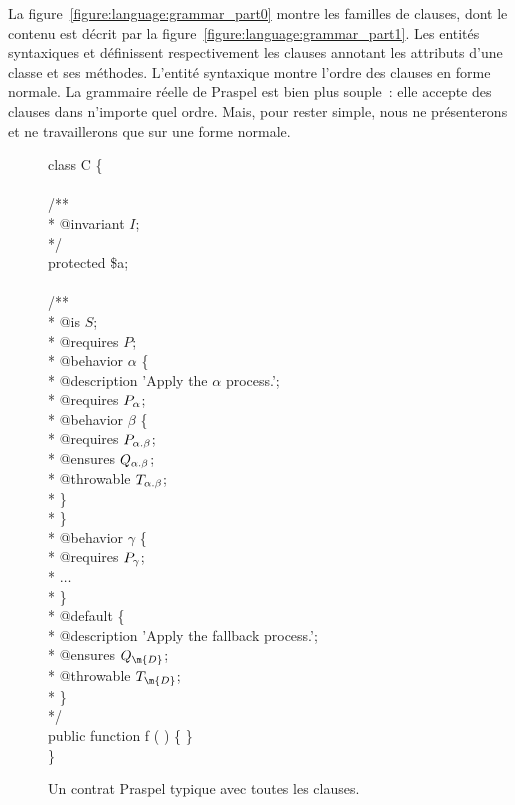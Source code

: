 La figure~\ref{figure:language:grammar_part0} montre les familles de clauses,
dont le contenu est décrit par la figure~\ref{figure:language:grammar_part1}.
Les entités syntaxiques  et 
définissent respectivement les clauses annotant les attributs d'une classe et
ses méthodes. L'entité syntaxique  montre l'ordre des
clauses en forme normale. La grammaire réelle de Praspel est bien plus souple~:
elle accepte des clauses dans n'importe quel ordre. Mais, pour rester simple,
nous ne présenterons et ne travaillerons que sur une forme normale.

\begin{figure}
\begin{bigpre}
class C \{ \\
\\
    /** \\
     * @invariant \(I\); \\
     */ \\
    protected \$a; \\
\\
    /** \\
     * @is \(S\); \\
     * @requires \(P\); \\
     * @behavior \(\alpha\) \{ \\
     *     @description 'Apply the \(\alpha\) process.'; \\
     *     @requires \(P\sb{\alpha}\); \\
     *     @behavior \(\beta\) \{ \\
     *         @requires  \(P\sb{\alpha.\beta}\); \\
     *         @ensures   \(Q\sb{\alpha.\beta}\); \\
     *         @throwable \(T\sb{\alpha.\beta}\); \\
     *     \} \\
     * \} \\
     * @behavior \(\gamma\) \{ \\
     *     @requires \(P\sb{\gamma}\); \\
     *     \(\dots\) \\
     * \} \\
     * @default \{ \\
     *     @description 'Apply the fallback process.'; \\
     *     @ensures   \(Q\sb{\m{D}}\); \\
     *     @throwable \(T\sb{\m{D}}\); \\
     * \} \\
     */ \\
    public function f ( ) \{ \} \\
\}
\end{bigpre}

\caption{\label{figure:language:typical_contract} Un contrat Praspel typique
avec toutes les clauses.}

\end{figure}

